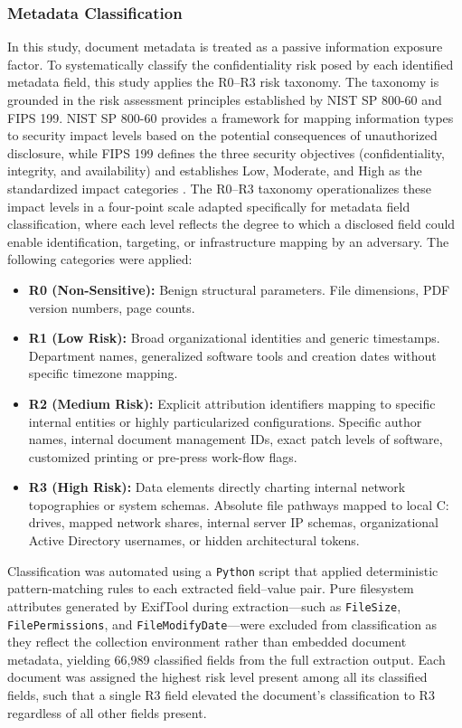 \documentclass[conference]{IEEEtran}
\begin{document}
\subsubsection{Metadata Classification}
In this study, document metadata is treated as a passive information exposure factor. To systematically classify the confidentiality risk posed by each identified metadata field, this study applies the R0–R3 risk taxonomy. The taxonomy is grounded in the risk assessment principles established by NIST SP 800-60 and FIPS 199. NIST SP 800-60 provides a framework for mapping information types to security impact levels based on the potential consequences of unauthorized disclosure, while FIPS 199 defines the three security objectives (confidentiality, integrity, and availability) and establishes Low, Moderate, and High as the standardized impact categories \cite{nist800_60, fips199}. The R0–R3 taxonomy operationalizes these impact levels in a four-point scale adapted specifically for metadata field classification, where each level reflects the degree to which a disclosed field could enable identification, targeting, or infrastructure mapping by an adversary. The following categories were applied:

\begin{itemize}
    \item \textbf{R0 (Non-Sensitive):} Benign structural parameters. File dimensions, PDF version numbers, page counts.
    \item \textbf{R1 (Low Risk):} Broad organizational identities and generic timestamps. Department names, generalized software tools and creation dates without specific timezone mapping.
    \item \textbf{R2 (Medium Risk):} Explicit attribution identifiers mapping to specific internal entities or highly particularized configurations. Specific author names, internal document management IDs, exact patch levels of software, customized printing or pre-press work-flow flags.
    \item \textbf{R3 (High Risk):} Data elements directly charting internal network topographies or system schemas. Absolute file pathways mapped to local C: drives, mapped network shares, internal server IP schemas, organizational Active Directory usernames, or hidden architectural tokens.
\end{itemize}

Classification was automated using a \texttt{Python} script that applied deterministic pattern-matching rules to each extracted field--value pair. Pure filesystem attributes generated by ExifTool during extraction---such as \texttt{FileSize}, \texttt{FilePermissions}, and \texttt{FileModifyDate}---were excluded from classification as they reflect the collection environment rather than embedded document metadata, yielding 66,989 classified fields from the full extraction output. Each document was assigned the highest risk level present among all its classified fields, such that a single R3 field elevated the document's classification to R3 regardless of all other fields present.
\end{document}
